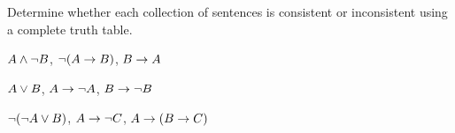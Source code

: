 \problempart
\label{pr.TT.consistent}
Determine whether each collection of sentences is consistent or inconsistent using a complete truth table. 
\begin{earg}
\item $A \wedge \neg B$, $\neg(A \rightarrow B)$, $B \rightarrow A$\vspace{.5ex} %


\item $A \vee B$, $A \rightarrow \neg A$, $B \rightarrow \neg B$ \vspace{.5ex}%


\item $\neg(\neg A \vee B) $, $A \rightarrow \neg C$, $A \rightarrow (B \rightarrow C)$\vspace{.5ex} %


\end{earg}
